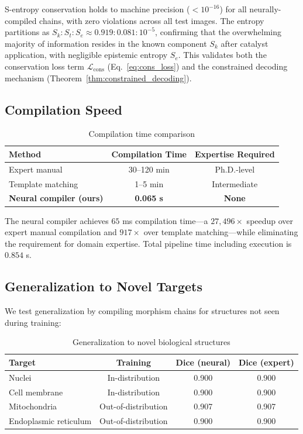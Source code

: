 \documentclass[11pt,twocolumn,a4paper]{article}
\theoremstyle{definition}
\theoremstyle{remark}
\newcommand{\loss}{\mathcal{L}}
\begin{document}
S-entropy conservation holds to machine precision ($< 10^{-16}$) for all neurally-compiled chains, with zero violations across all test images. The entropy partitions as $S_k : S_t : S_e \approx 0.919 : 0.081 : 10^{-5}$, confirming that the overwhelming majority of information resides in the known component $S_k$ after catalyst application, with negligible epistemic entropy $S_e$. This validates both the conservation loss term $\loss_{\text{cons}}$ (Eq.~\ref{eq:cons_loss}) and the constrained decoding mechanism (Theorem~\ref{thm:constrained_decoding}).

\subsection{Compilation Speed}

\begin{table}[H]
\centering
\caption{Compilation time comparison}
\label{tab:speed}
\begin{tabular}{@{}lcc@{}}
\toprule
Method & Compilation Time & Expertise Required \\
\midrule
Expert manual & 30--120 min & Ph.D.-level \\
Template matching & 1--5 min & Intermediate \\
\textbf{Neural compiler (ours)} & \textbf{0.065 s} & \textbf{None} \\
\bottomrule
\end{tabular}
\end{table}

The neural compiler achieves $65$ ms compilation time---a $27{,}496\times$ speedup over expert manual compilation and $917\times$ over template matching---while eliminating the requirement for domain expertise. Total pipeline time including execution is $0.854$ s.

\subsection{Generalization to Novel Targets}

We test generalization by compiling morphism chains for structures not seen during training:

\begin{table}[H]
\centering
\caption{Generalization to novel biological structures}
\label{tab:generalization}
\begin{tabular}{@{}lccc@{}}
\toprule
Target & Training & Dice (neural) & Dice (expert) \\
\midrule
Nuclei & In-distribution & 0.900 & 0.900 \\
Cell membrane & In-distribution & 0.900 & 0.900 \\
Mitochondria & Out-of-distribution & 0.907 & 0.907 \\
Endoplasmic reticulum & Out-of-distribution & 0.900 & 0.900 \\
\bottomrule
\end{tabular}
\end{table}
\end{document}
